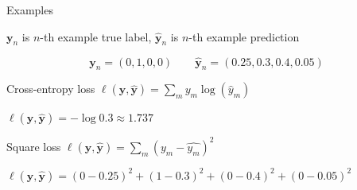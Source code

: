 \documentclass[12pt]{beamer}
\begin{document}
\begin{frame}{Examples}

$\mathbf{y}_n$ is $n$-th example true label, $\hat{\mathbf{y}}_n$ is $n$-th example prediction

$$\mathbf{y}_n = (0, 1, 0, 0) \qquad \hat{\mathbf{y}}_n = (0.25, 0.3, 0.4, 0.05)$$

Cross-entropy loss $\ell(\mathbf{y}, \hat{\mathbf{y}}) = \sum_{m} y_m \log (\hat{y}_m)$

$\ell(\mathbf{y}, \hat{\mathbf{y}}) = - \log 0.3 \approx 1.737$

\bigskip

Square loss $\ell(\mathbf{y}, \hat{\mathbf{y}}) =  \sum_{m} (y_m - \hat{y_m})^2$

$\ell(\mathbf{y}, \hat{\mathbf{y}}) = (0-0.25)^2 + (1 - 0.3)^2 + (0-0.4)^2 + (0 - 0.05)^2$


\end{frame}
\end{document}
